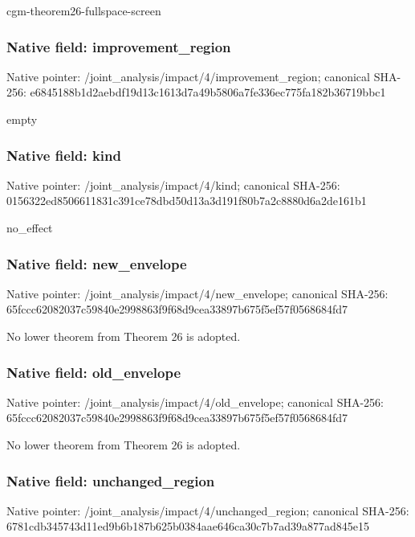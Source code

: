 \documentclass[10pt,a4paper]{article}
\begin{document}
\begingroup\raggedright\sloppy cgm-theorem26-fullspace-screen\par\endgroup

\subsubsection{Native field: improvement\_\allowbreak{}region}
Native pointer: /joint\_\allowbreak{}analysis/impact/4/improvement\_\allowbreak{}region; canonical SHA-256: e6845188b1d2aebdf19d13c1613d7a49b5806a7fe336ec775fa182b36719bbc1

\begingroup\raggedright\sloppy empty\par\endgroup

\subsubsection{Native field: kind}
Native pointer: /joint\_\allowbreak{}analysis/impact/4/kind; canonical SHA-256: 0156322ed8506611831c391ce78dbd50d13a3d191f80b7a2c8880d6a2de161b1

\begingroup\raggedright\sloppy no\_\allowbreak{}effect\par\endgroup

\subsubsection{Native field: new\_\allowbreak{}envelope}
Native pointer: /joint\_\allowbreak{}analysis/impact/4/new\_\allowbreak{}envelope; canonical SHA-256: 65fccc62082037c59840e2998863f9f68d9cea33897b675f5ef57f0568684fd7

\begingroup\raggedright\sloppy No lower theorem from Theorem 26 is adopted.\par\endgroup

\subsubsection{Native field: old\_\allowbreak{}envelope}
Native pointer: /joint\_\allowbreak{}analysis/impact/4/old\_\allowbreak{}envelope; canonical SHA-256: 65fccc62082037c59840e2998863f9f68d9cea33897b675f5ef57f0568684fd7

\begingroup\raggedright\sloppy No lower theorem from Theorem 26 is adopted.\par\endgroup

\subsubsection{Native field: unchanged\_\allowbreak{}region}
Native pointer: /joint\_\allowbreak{}analysis/impact/4/unchanged\_\allowbreak{}region; canonical SHA-256: 6781cdb345743d11ed9b6b187b625b0384aae646ca30c7b7ad39a877ad845e15
\end{document}
